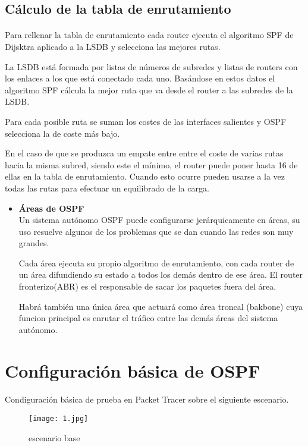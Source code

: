 \documentclass[a4paper,11pt]{article}
\begin{document}
\subsection{Cálculo de la tabla de enrutamiento}
\paragraph{  }
Para rellenar la tabla de enrutamiento cada router ejecuta el algoritmo SPF de Dijsktra aplicado a la LSDB y selecciona las mejores rutas.

La LSDB está formada por listas de números de subredes y listas de routers con los enlaces a los que está conectado cada uno. Basándose en estos datos el algoritmo SPF cálcula la mejor ruta que va desde el router a las subredes de la LSDB.

Para cada posible ruta se suman los costes de las interfaces salientes y OSPF selecciona la de coste más bajo. 

En el caso de que se produzca un empate entre entre el coste de varias rutas hacia la misma subred, siendo este el mínimo, el router puede poner hasta 16 de ellas en la tabla de enrutamiento. Cuando esto ocurre pueden usarse a la vez todas las rutas para efectuar un equilibrado de la carga.

\begin{itemize}
  \item \textbf{Áreas de OSPF}\\
  Un sistema autónomo OSPF puede configurarse jerárquicamente en áreas, su uso resuelve algunos de los problemas que se dan cuando las redes son muy grandes.
  
  Cada área ejecuta su propio algoritmo de enrutamiento, con cada router de un área difundiendo su estado a todos los demás dentro de ese área. El router fronterizo(ABR) es el responsable de sacar los paquetes fuera del área.
  
  Habrá también una única área que actuará como área troncal (bakbone) cuya funcion principal es enrutar el tráfico entre las demás áreas del sistema autónomo.
\end{itemize}


\section{Configuración básica de OSPF}
\paragraph{  }
Condiguración básica de prueba en Packet Tracer sobre el siguiente escenario.
\begin{figure}[ht!]
  \begin{center}
    \texttt{[image: 1.jpg]}
    \label{fig:base}
    \caption{escenario base}
  \end{center}
\end{figure}
\end{document}

